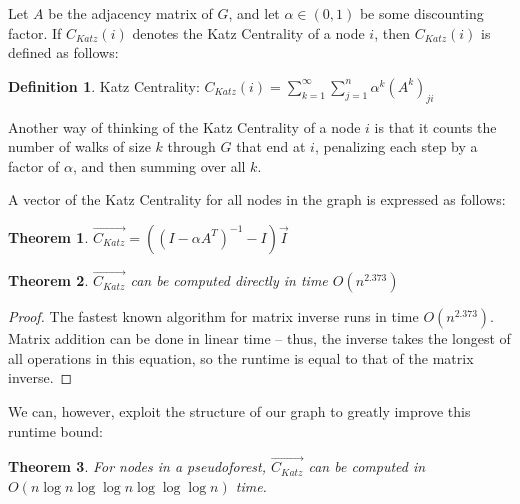 \documentclass[10pt]{article}
\newtheorem{theorem}{Theorem}[section]
\theoremstyle{definition}
\newtheorem{definition}{Definition}[section]
\begin{document}
Let $A$ be the adjacency matrix of $G$, and let $\alpha \in (0,1)$ be some discounting factor. If $C_{Katz}(i)$ denotes the Katz Centrality of a node $i$, then $C_{Katz}(i)$ is defined as follows:
\theoremstyle{definition}
\begin{definition}{Katz Centrality:}
$C_{Katz}(i) = \sum\limits_{k=1}^{\infty}\sum\limits_{j=1}^n\alpha^k(A^k)_{ji}$
\end{definition}

Another way of thinking of the Katz Centrality of a node $i$ is that it counts the number of walks of size $k$ through $G$ that end at $i$, penalizing each step by a factor of $\alpha$, and then summing over all $k$.

A vector of the Katz Centrality for all nodes in the graph is expressed as follows:

\begin{theorem}
$\overrightarrow{C_{Katz}}  = ((I - \alpha A^T)^{-1}-I)\vec{I}$
\end{theorem}

\begin{theorem}
$\overrightarrow{C_{Katz}}$ can be computed directly in time $O(n^{2.373})$
\end{theorem}
\begin{proof}
The fastest known algorithm for matrix inverse runs in time $O(n^{2.373})$. Matrix addition can be done in linear time -- thus, the inverse takes the longest of all operations in this equation, so the runtime is equal to that of the matrix inverse.
\end{proof}

We can, however, exploit the structure of our graph to greatly improve this runtime bound:

\begin{theorem}
For nodes in a pseudoforest, $\overrightarrow{C_{Katz}}$ can be computed in \\
$O(n \log n \log \log n \log \log \log n)$ time.
\end{theorem}
\end{document}
